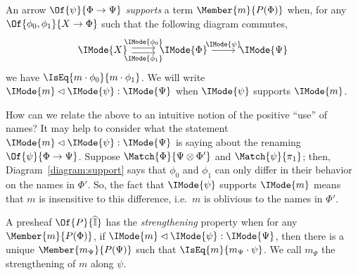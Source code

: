 \documentclass{article}
\newcommand\Psh[1]{\widehat{#1}}
\begin{document}
\newcommand\Supports[3]{\IMode{#3}\lhd\IMode{#2}:\IMode{#1}}
\begin{definition}[Support]\label{def:support}
  An arrow $\Of{\psi}{\Phi\to\Psi}$ \emph{supports} a term
  $\Member{m}{P(\Phi)}$ when, for any $\Of{\phi_0,\phi_1}{X\to\Phi}$
  such that the following diagram commutes,
  \begin{equation}\label{diagram:support}
    \begin{tikzcd}
      \IMode{X}
      \arrow[r,shift left=1,"\IMode{\phi_0}"]
      \arrow[r,swap,shift right=1,"\IMode{\phi_1}"]
      &
      \IMode{\Phi}
      \arrow[r, "\IMode{\psi}"]
      &
      \IMode{\Psi}
    \end{tikzcd}
  \end{equation}
  we have $\IsEq{m\cdot\phi_0}{m\cdot\phi_1}$. We will write
  $\Supports{\Psi}{\psi}{m}$ when $\IMode{\psi}$ supports $\IMode{m}$.
\end{definition}

\begin{remark}
  How can we relate the above to an intuitive notion of the positive
  ``use'' of names? It may help to consider what the statement
  $\Supports{\Psi}{\psi}{m}$ is saying about the renaming
  $\Of{\psi}{\Phi\to\Psi}$. Suppose $\Match{\Phi}{\Psi\otimes\Phi'}$
  and $\Match{\psi}{\pi_1}$; then, Diagram~\ref{diagram:support} says
  that $\phi_0$ and $\phi_1$ can only differ in their behavior on the
  names in $\Phi'$. So, the fact that $\IMode{\psi}$ supports
  $\IMode{m}$ means that $m$ is insensitive to this difference, i.e.\
  $m$ is oblivious to the names in $\Phi'$.
\end{remark}

\begin{definition}[Strengthening]
  A presheaf $\Of{P}{\Psh{\CatI}}$ has the \emph{strengthening}
  property when for any $\Member{m}{P(\Phi)}$, if
  $\Supports{\Psi}{\psi}{m}$, then there is a unique
  $\Member{m_\Psi}{P(\Psi)}$ such that $\IsEq{m}{m_\Psi\cdot\psi}$. We call
  $m_\Psi$ the strengthening of $m$ along $\psi$.
\end{definition}
\end{document}
